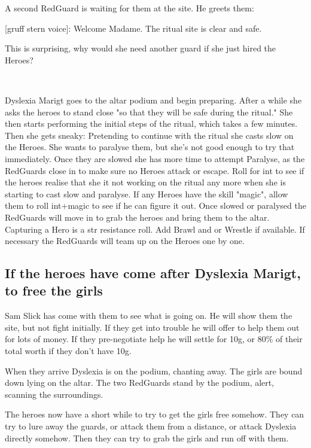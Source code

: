 A second RedGuard is waiting for them at the site. He greets them:
\begin{readoutloud}
\textnormal{[gruff stern voice]:} Welcome Madame. The ritual site is clear and safe.
\end{readoutloud}
This is surprising, why would she need another guard if she just hired the Heroes?

\

Dyslexia Marigt goes to the altar podium and begin preparing. After a while she asks the heroes to stand close "so that they will be safe during the ritual."
She then starts performing the initial steps of the ritual, which takes a few minutes. Then she gets sneaky: Pretending to continue with the ritual she casts slow on the Heroes. She wants to paralyse them, but she's not good enough to try that immediately. Once they are slowed she has more time to attempt Paralyse, as the RedGuards close in to make sure no Heroes attack or escape.
Roll for int to see if the heroes realise that she it not working on the ritual any more when she is starting to cast slow and paralyse. If any Heroes have the skill "magic", allow them to roll int+magic to see if he can figure it out.
Once slowed or paralysed the RedGuards will move in to grab the heroes and bring them to the altar. Capturing a Hero is a str resistance roll. Add Brawl and or Wrestle if available. If necessary the RedGuards will team up on the Heroes one by one.


\subsection*{If the heroes have come after Dyslexia Marigt, to free the girls}
Sam Slick has come with them to see what is going on. He will show them the site, but not fight initially. If they get into trouble he will offer to help them out for lots of money. If they pre-negotiate help he will settle for 10g, or 80\% of their total worth if they don't have 10g.

When they arrive Dyslexia is on the podium, chanting away. The girls are bound down lying on the altar. The two RedGuards stand by the podium, alert, scanning the surroundings.

The heroes now have a short while to try to get the girls free somehow. They can try to lure away the guards, or attack them from a distance, or attack Dyslexia directly somehow. Then they can try to grab the girls and run off with them.


